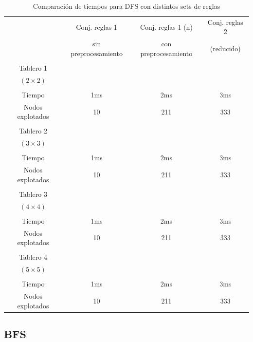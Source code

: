 \documentclass[%
	final,
	reprint,
	notitlepage,
	narroweqnarray,
	inline,
	twoside,
	invited
	]{ieee}
\begin{document}
\begin{table}[H]
\begin{center}
\begin{tabular}{|c|c|c|c|}
\hline
 & Conj. reglas 1 & Conj. reglas 1 (n) & Conj. reglas 2\\
 & sin preprocesamiento & con preprocesamiento & (reducido)\\
\hline
\hline

&&&\\
Tablero 1 & & &\\
$(2\times 2)$ & & &\\
&&&\\
Tiempo & 1ms & 2ms & 3ms\\
Nodos explotados & 10 & 211 & 333\\

\hline
\hline

&&&\\
Tablero 2 & & &\\
$(3\times 3)$ & & &\\
&&&\\
Tiempo & 1ms & 2ms & 3ms\\
Nodos explotados & 10 & 211 & 333\\

\hline
\hline

&&&\\
Tablero 3 & & &\\
$(4\times 4)$ & & &\\
&&&\\
Tiempo & 1ms & 2ms & 3ms\\
Nodos explotados & 10 & 211 & 333\\

\hline
\hline

&&&\\
Tablero 4 & & &\\
$(5\times 5)$ & & &\\
&&&\\
Tiempo & 1ms & 2ms & 3ms\\
Nodos explotados & 10 & 211 & 333\\


\hline  
\end{tabular}
\end{center}
\caption{Comparación de tiempos para DFS con distintos sets de reglas}
\label{tablaDFS}
\end{table}

\clearpage

\subsection{BFS}
\end{document}
